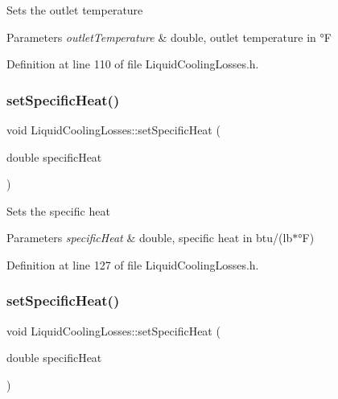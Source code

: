 Sets the outlet temperature 
\begin{DoxyParams}{Parameters}
{\em outlet\+Temperature} & double, outlet temperature in °F \\
\hline
\end{DoxyParams}


Definition at line 110 of file Liquid\+Cooling\+Losses.\+h.

\mbox{\label{class_liquid_cooling_losses_a38ff1ff4dc0de69c72db094bf2259993}} 
\subsubsection{\texorpdfstring{set\+Specific\+Heat()}{setSpecificHeat()}\hspace{0.1cm}{\footnotesize\ttfamily [1/3]}}
{\footnotesize\ttfamily void Liquid\+Cooling\+Losses\+::set\+Specific\+Heat (\begin{DoxyParamCaption}\item[{double}]{specific\+Heat }\end{DoxyParamCaption})\hspace{0.3cm}{\ttfamily [inline]}}

Sets the specific heat 
\begin{DoxyParams}{Parameters}
{\em specific\+Heat} & double, specific heat in btu/(lb$\ast$°F) \\
\hline
\end{DoxyParams}


Definition at line 127 of file Liquid\+Cooling\+Losses.\+h.

\mbox{\label{class_liquid_cooling_losses_a38ff1ff4dc0de69c72db094bf2259993}} 
\subsubsection{\texorpdfstring{set\+Specific\+Heat()}{setSpecificHeat()}\hspace{0.1cm}{\footnotesize\ttfamily [2/3]}}
{\footnotesize\ttfamily void Liquid\+Cooling\+Losses\+::set\+Specific\+Heat (\begin{DoxyParamCaption}\item[{double}]{specific\+Heat }\end{DoxyParamCaption})\hspace{0.3cm}{\ttfamily [inline]}}

